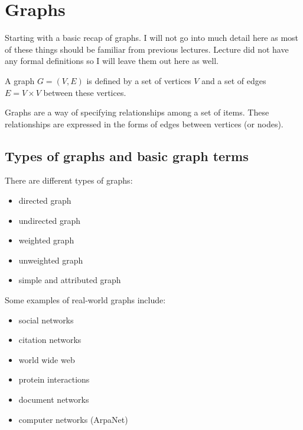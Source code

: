 \section{Graphs}

\bigskip

\noindent Starting with a basic recap of graphs. I will not go into much detail here as most of these things should be familiar from previous lectures. Lecture did not have any formal definitions so I will leave them out here as well.

\bigskip

\begin{definition}[Graph]
A graph $G = (V,E)$ is defined by a set of vertices $V$ and a set of edges $E = V \times V$ between these vertices.
\end{definition}

\bigskip

\noindent Graphs are a way of specifying relationships among a set of items. These relationships are expressed in the forms of edges between vertices (or nodes).

\subsection{Types of graphs and basic graph terms}

\bigskip

\noindent There are different types of graphs:

\begin{itemize}
    \item directed graph
    \item undirected graph
    \item weighted graph
    \item unweighted graph
    \item simple and attributed graph
\end{itemize}

\bigskip

\noindent Some examples of real-world graphs include:

\begin{itemize}
    \item social networks
    \item citation networks
    \item world wide web
    \item protein interactions
    \item document networks
    \item computer networks (ArpaNet)
\end{itemize}

